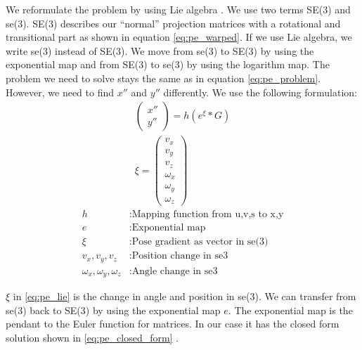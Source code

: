 \documentclass[11pt,a4paper,titlepage,oneside]{report}
\begin{document}
We reformulate the problem by using Lie algebra \cite{se3_explain}. We use two terms SE(3) and se(3). SE(3) describes our ``normal'' projection matrices with a rotational and transitional part as shown in equation \ref{eq:pe_warped}. If we use Lie algebra, we write se(3) instead of SE(3). We move from se(3) to SE(3) by using the exponential map and from SE(3) to se(3) by using the logarithm map. The problem we need to solve stays the same as in equation \ref{eq:pe_problem}. However, we need to find $x''$ and $y''$ differently. We use the following formulation:
\begin{equation}\label{eq:pe_lie}
  \begin{gathered}
    \begin{pmatrix}
      x''\\
      y''
    \end{pmatrix}
    =h(e^{\xi}*G)\\
    \xi=\begin{pmatrix}
      v_x\\
      v_y\\
      v_z\\
      \omega_x\\
      \omega_y\\
      \omega_z
    \end{pmatrix}
  \end{gathered}
\end{equation}
\begin{align*}
  h                            &: \text{Mapping function from u,v,s to x,y}\\
  e                            &: \text{Exponential map}\\
  \xi                          &: \text{Pose gradient as vector in se(3)}\\
  v_x,v_y,v_z                  &: \text{Position change in se3}\\
  \omega_x,\omega_y,\omega_z   &: \text{Angle change in se3}
\end{align*}

$\xi$ in \ref{eq:pe_lie} is the change in angle and position in se(3). We can transfer from se(3) back to SE(3) by using the exponential map $e$. The exponential map is the pendant to the Euler function for matrices. In our case it has the closed form solution shown in \ref{eq:pe_closed_form} \cite{rvc}.
\end{document}
